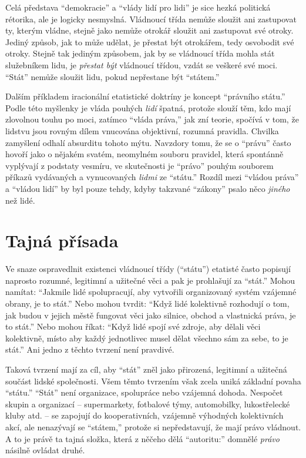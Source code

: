 \documentclass{book}
\begin{document}
Celá představa \enquote{demokracie} a \enquote{vlády lidí pro lidi} je sice hezká politická rétorika, ale je logicky nesmyslná. Vládnoucí třída nemůže sloužit ani zastupovat ty, kterým vládne, stejně jako nemůže otrokář sloužit ani zastupovat své otroky. Jediný způsob, jak to může udělat, je přestat být otrokářem, tedy osvobodit své otroky. Stejně tak jediným způsobem, jak by se vládnoucí třída mohla stát služebníkem lidu, je \emph{přestat být} vládnoucí třídou, vzdát se veškeré své moci. \enquote{Stát} nemůže sloužit lidu, pokud nepřestane být \enquote{státem.}

Dalším příkladem iracionální etatistické doktríny je koncept \enquote{právního státu.} Podle této myšlenky je vláda pouhých \emph{lidí} špatná, protože slouží těm, kdo mají zlovolnou touhu po moci, zatímco \enquote{vláda práva,} jak zní teorie, spočívá v tom, že lidstvu jsou rovným dílem vnucována objektivní, rozumná pravidla. Chvilka zamyšlení odhalí absurditu tohoto mýtu. Navzdory tomu, že se o \enquote{právu} často hovoří jako o nějakém svatém, neomylném souboru pravidel, která spontánně vyplývají z podstaty vesmíru, ve skutečnosti je \enquote{právo} pouhým souborem příkazů vydávaných a vynucovaných \emph{lidmi} ze \enquote{státu.} Rozdíl mezi \enquote{vládou práva} a \enquote{vládou lidí} by byl pouze tehdy, kdyby takzvané \enquote{zákony} psalo něco \emph{jiného} než lidé.

\section{Tajná přísada}

Ve snaze ospravedlnit existenci vládnoucí třídy (\enquote{státu}) etatisté často popisují naprosto rozumné, legitimní a užitečné věci a pak je prohlašují za \enquote{stát.} Mohou namítat: \enquote{Jakmile lidé spolupracují, aby vytvořili organizovaný systém vzájemné obrany, je to stát.} Nebo mohou tvrdit: \enquote{Když lidé kolektivně rozhodují o tom, jak budou v jejich městě fungovat věci jako silnice, obchod a vlastnická práva, je to stát.} Nebo mohou říkat: \enquote{Když lidé spojí své zdroje, aby dělali věci kolektivně, místo aby každý jednotlivec musel dělat všechno sám za sebe, to je stát.} Ani jedno z těchto tvrzení není pravdivé.

Taková tvrzení mají za cíl, aby \enquote{stát} zněl jako přirozená, legitimní a užitečná součást lidské společnosti. Všem těmto tvrzením však zcela uniká základní povaha \enquote{státu.} \enquote{Stát} není organizace, spolupráce nebo vzájemná dohoda. Nespočet skupin a organizací -- supermarkety, fotbalové týmy, automobilky, lukostřelecké kluby atd. -- se zapojují do kooperativních, vzájemně výhodných kolektivních akcí, ale nenazývají se \enquote{státem,} protože si nepředstavují, že mají právo vládnout. A to je právě ta tajná složka, která z něčeho dělá \enquote{autoritu:} domnělé \emph{právo} násilně ovládat druhé.
\end{document}
